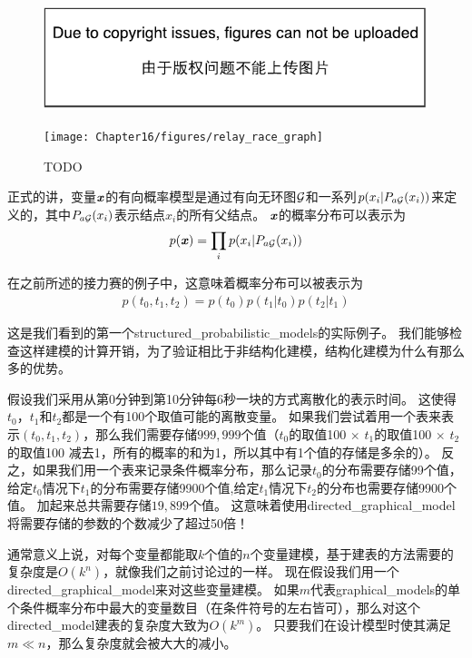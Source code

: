 \begin{figure}[!htb]
\ifOpenSource
\centerline{\includegraphics{figure.pdf}}
\else
	\centerline{\texttt{[image: Chapter16/figures/relay\_race\_graph]}}	
\fi
	\caption{TODO}
	\label{fig:relay_race_graph}
\end{figure}


正式的讲，变量$\boldsymbol{\mathit{x}}$的有向概率模型是通过有向无环图$\mathcal{G}$和一系列$p(x_i\vert P_{a\mathcal{G}}(x_i))$来定义的，其中$P_{a\mathcal{G}}(x_i)$表示结点$x_i$的所有父结点。
$\boldsymbol{\mathit{x}}$的概率分布可以表示为
\begin{align}
\label{eqn:161}
p(\boldsymbol{\mathit{x}}) = \prod_{i} p(x_i\vert P_{a\mathcal{G}}(x_i))
\end{align}


在之前所述的接力赛的例子中，这意味着概率分布可以被表示为
\begin{align}
\label{eqn:162}
p(t_0,t_1,t_2) = p(t_0)p(t_1\vert t_0)p(t_2\vert t_1)
\end{align}


这是我们看到的第一个\gls{structured_probabilistic_models}的实际例子。
我们能够检查这样建模的计算开销，为了验证相比于非结构化建模，结构化建模为什么有那么多的优势。


假设我们采用从第0分钟到第10分钟每6秒一块的方式离散化的表示时间。
这使得$t_0$，$t_1$和$t_2$都是一个有100个取值可能的离散变量。
如果我们尝试着用一个表来表示$(t_0,t_1,t_2)$，那么我们需要存储$999,999$个值（$t_0$的取值100 $\times$ $t_1$的取值100 $\times$ $t_2$的取值100 减去1，所有的概率的和为1，所以其中有1个值的存储是多余的）。
反之，如果我们用一个表来记录条件概率分布，那么记录$t_0$的分布需要存储99个值，给定$t_0$情况下$t_1$的分布需要存储9900个值,给定$t_1$情况下$t_2$的分布也需要存储9900个值。
加起来总共需要存储$19, 899$个值。
这意味着使用\gls{directed_graphical_model}将需要存储的参数的个数减少了超过50倍！


通常意义上说，对每个变量都能取$k$个值的$n$个变量建模，基于建表的方法需要的复杂度是$O(k^n)$，就像我们之前讨论过的一样。
现在假设我们用一个\gls{directed_graphical_model}来对这些变量建模。
如果$m$代表\gls{graphical_models}的单个条件概率分布中最大的变量数目（在条件符号的左右皆可），那么对这个\gls{directed_model}建表的复杂度大致为$O(k^m)$。
只要我们在设计模型时使其满足$m\ll n$，那么复杂度就会被大大的减小。


